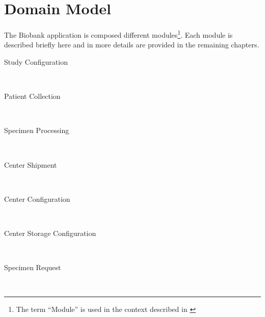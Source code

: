 \chapter{Domain Model}

The Biobank application is composed different modules\footnote{The term ``Module''
  is used in the context described in \cite{vernon2013implementing}}. Each
module is described briefly here and in more details are provided in the
remaining chapters.


\begin{description}

  \item[Study Configuration] \hfill \\

  \item[Patient Collection] \hfill \\

  \item[Specimen Processing] \hfill \\

  \item[Center Shipment] \hfill \\

  \item[Center Configuration] \hfill \\

  \item[Center Storage Configuration] \hfill \\

  \item[Specimen Request] \hfill \\

\end{description}
